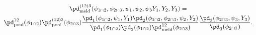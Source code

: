 \begin{multline}
  \pd_{\text{meld}}^{(12)3}(\phi_{1 \cap 2}, \phi_{2 \cap 3}, \psi_{1}, \psi_{2}, \psi_{3} Y_{1}, Y_{2}, Y_{3}) = \\
    \pd_{\text{pool}}^{12}(\phi_{1 \cap 2})
    \pd_{\text{pool}}^{(12)3}(\phi_{2 \cap 3}) 
    \frac{
      \pd_{1}(\phi_{1 \cap 2}, \psi_{1}, Y_{1})
      \pd_{2}(\phi_{1 \cap 2}, \phi_{2 \cap 3}, \psi_{2}, Y_{2})
    } {
      \pd_{1}(\phi_{1 \cap 2})
      \pd_{2}(\phi_{1 \cap 2})
      \pd_{\text{meld}}^{12}(\phi_{2 \cap 3})
    }
    \frac{
      \pd_{3}(\phi_{2 \cap 3}, \psi_{3}, Y_{3})
    } {
      \pd_{3}(\phi_{2 \cap 3})
    }.
  \label{eqn:expanded-double-melded-model}
\end{multline}